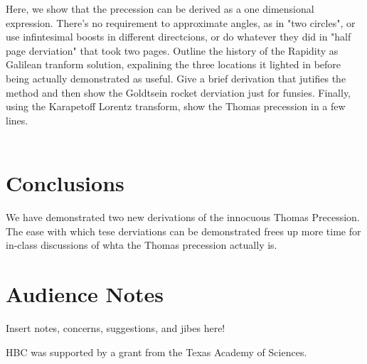 \documentclass[prb,preprint]{revtex4-1}
\begin{document}
Here, we show that the precession can be derived as a one dimensional expression.  There's no requirement to approximate angles, as in "two circles", or use infintesimal boosts in different directcions, or do whatever they did in "half page derviation" that took two pages.  Outline the history of the Rapidity as Galilean tranform solution, expalining the three locations it lighted in before being actually demonstrated as useful.  Give a brief derivation that jutifies the method and then show the Goldtsein rocket derviation just for funsies.  Finally, using the Karapetoff Lorentz transform, show the Thomas precession in a few lines.
\\
\\
\section{Conclusions}
We have demonstrated two new derivations of the innocuous Thomas Precession.  The ease with which tese derviations can be demonstrated frees up more time for in-class discussions of whta the Thomas precession actually is.

\section{Audience Notes}
Insert notes, concerns, suggestions, and jibes here!

\begin{acknowledgments}
HBC was supported by a grant from the Texas Academy of Sciences.\end{acknowledgments}
\end{document}
